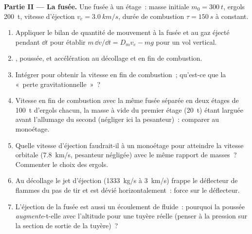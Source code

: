 \begin{problem}
\medskip
\noindent\textbf{Partie II --- La fusée.}
Une fusée à un étage~: masse initiale $m_0 = \qty{300}{t}$, ergols
\qty{200}{t}, vitesse d'éjection $v_e = \qty{3.0}{km/s}$, durée de combustion $\tau =
\qty{150}{s}$ à  constant.
\begin{enumerate}[resume]
  \item Appliquer le bilan de quantité de mouvement à la fusée et au gaz éjecté pendant
        $\dd t$ pour établir $m\,\dd v/\dd t = D_mv_e - mg$ pour un
        vol vertical.
  \item {}, poussée, et accélération au décollage et
        en fin de combustion.
  \item Intégrer pour obtenir la vitesse en fin de combustion~; qu'est-ce que la «~perte
        gravitationnelle~»~?
  \item Vitesse en fin de combustion avec la même fusée séparée en deux étages de
        \qty{100}{t} d'ergols chacun, la masse à vide du premier étage
        (\qty{20}{t}) étant larguée avant l'allumage du second (négliger
        ici la pesanteur)~: comparer au monoétage.
  \item Quelle vitesse d'éjection faudrait-il à un monoétage pour atteindre la vitesse
        orbitale (\qty{7.8}{km/s}, pesanteur négligée) avec le même
        rapport de masses~? Commenter le choix des ergols.
  \item Au décollage le jet d'éjection (\qty{1333}{kg/s} à \qty{3}{km/s}) frappe
        le déflecteur de flammes du pas de tir et est dévié horizontalement~:
        force sur le déflecteur.
  \item L'éjection de la fusée est aussi un écoulement de fluide~: pourquoi la poussée
        \emph{augmente}-t-elle avec l'altitude pour une tuyère réelle (penser à la
        pression sur la section de sortie de la tuyère)~?
\end{enumerate}


\end{problem}
